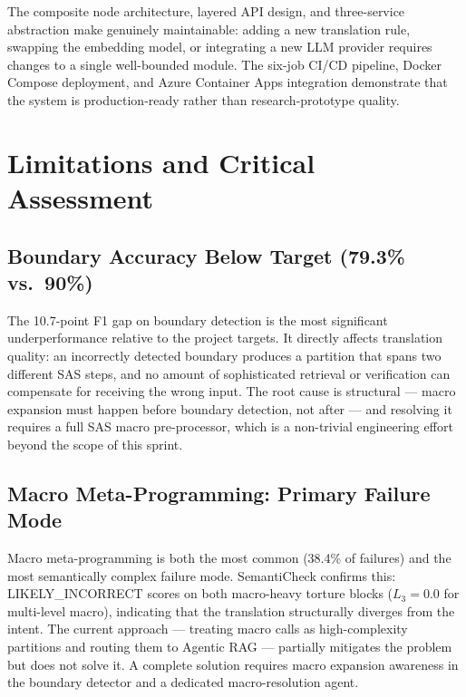 The composite node architecture, layered API design, and three-service
abstraction make \codara{} genuinely maintainable: adding a new translation
rule, swapping the embedding model, or integrating a new LLM provider requires
changes to a single well-bounded module. The six-job CI/CD pipeline, Docker
Compose deployment, and Azure Container Apps integration demonstrate that the
system is production-ready rather than research-prototype quality.

\section{Limitations and Critical Assessment}
\label{sec:limitations}

\subsection{Boundary Accuracy Below Target (79.3\% vs.\ 90\%)}
\label{subsec:limit-boundary}

The 10.7-point F1 gap on boundary detection is the most significant underperformance
relative to the project targets. It directly affects translation quality: an
incorrectly detected boundary produces a partition that spans two different
SAS steps, and no amount of sophisticated retrieval or verification can
compensate for receiving the wrong input. The root cause is structural ---
macro expansion must happen before boundary detection, not after --- and
resolving it requires a full SAS macro pre-processor, which is a non-trivial
engineering effort beyond the scope of this sprint.

\subsection{Macro Meta-Programming: Primary Failure Mode}
\label{subsec:limit-macros}

Macro meta-programming is both the most common (38.4\% of failures) and the
most semantically complex failure mode. SemantiCheck confirms this: LIKELY\_INCORRECT
scores on both macro-heavy torture blocks ($L_3 = 0.0$ for multi-level macro),
indicating that the translation structurally diverges from the intent. The
current approach --- treating macro calls as high-complexity partitions and
routing them to Agentic RAG --- partially mitigates the problem but does not
solve it. A complete solution requires macro expansion awareness in the
boundary detector and a dedicated macro-resolution agent.

